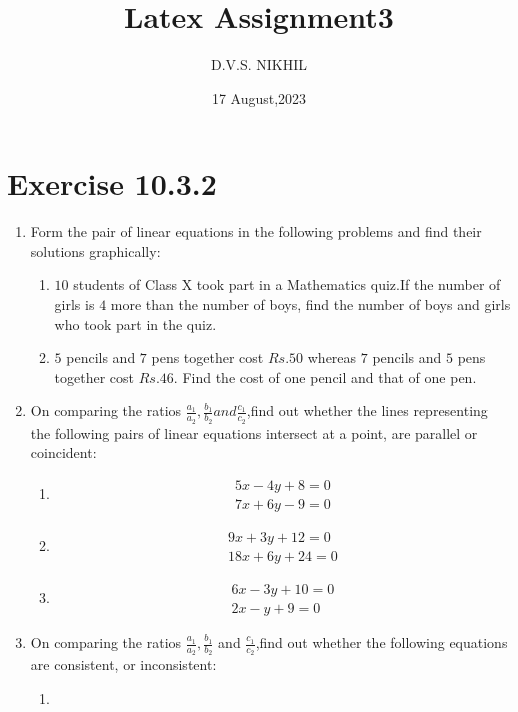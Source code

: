 \documentclass{article}
\theoremstyle{remark}
\begin{document}
\title{Latex Assignment3}
\author{D.V.S. NIKHIL}
\date{17 August,2023}
\maketitle
\section*{Exercise 10.3.2}
\begin{enumerate}
\item Form the pair of linear equations in the following problems and find their solutions graphically:
\begin{enumerate}[label=(\roman*)]
\item $10$ students of Class X took part in a Mathematics quiz.If the number of girls is $4$ more than the number of boys, find the number of boys and girls who took part in the quiz.
\item $5$ pencils and $7$ pens together cost $Rs.50$ whereas $7$ pencils and $5$ pens together cost $Rs.46$. Find the cost of one pencil and that of one pen.
\end{enumerate}
\item On comparing the ratios $\frac{a_{1}}{a_2},\frac{b_1}{b_2} and \frac{c_1}{c_2}$,find out whether the lines representing the following pairs of linear equations intersect at a point, are parallel or coincident:
\begin{enumerate}[label=(\roman*)]
\item \begin{align}
	5x-4y+8=0\\ 
      	7x+6y-9=0
	\end{align}
\item \begin{align}
	9x+3y+12=0\\
	18x+6y+24=0
	\end{align}
\item \begin{align}
        6x-3y+10=0\\
	2x-y+9=0
	\end{align}
\end{enumerate}
\item On comparing the ratios $\frac{a_1}{a_2},\frac{b_1}{b_2}$ and $\frac {c_1}{c_2}$,find out whether the following equations are consistent, or inconsistent:
\begin{enumerate}[label=(\roman*)]
	\item \begin{align}

\end{align}
\end{enumerate}
\end{enumerate}
\end{document}
